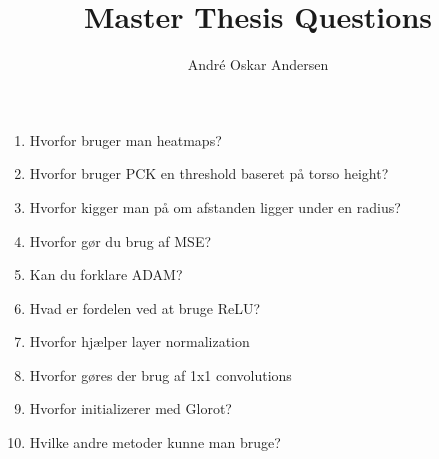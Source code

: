 \documentclass[a4paper]{report}
\title{Master Thesis Questions}
\author{André Oskar Andersen}
\date{}
\begin{document}
    
\maketitle

\begin{enumerate}
    \item Hvorfor bruger man heatmaps?
    \item Hvorfor bruger PCK en threshold baseret på torso height?
    \item Hvorfor kigger man på om afstanden ligger under en radius?
    \item Hvorfor gør du brug af MSE?
    \item Kan du forklare ADAM?
    \item Hvad er fordelen ved at bruge ReLU?
    \item Hvorfor hjælper layer normalization
    \item Hvorfor gøres der brug af 1x1 convolutions
    \item Hvorfor initializerer med Glorot?
    \item Hvilke andre metoder kunne man bruge?
\end{enumerate}
\end{document}
